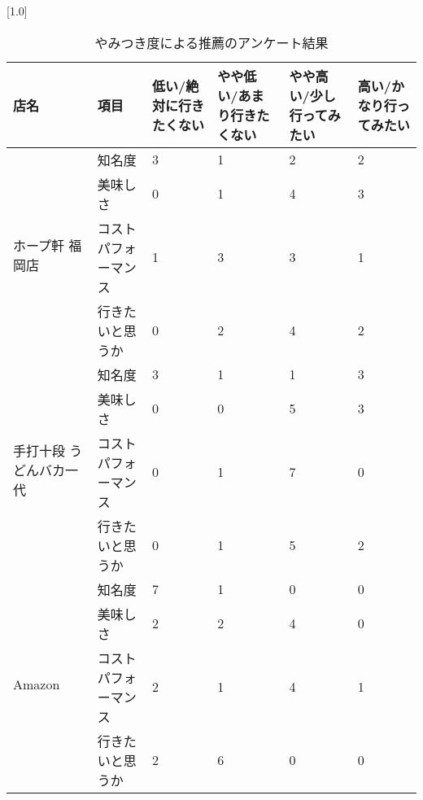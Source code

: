 \begin{table}[H]
\centering
\caption{やみつき度による推薦のアンケート結果}
\label{table:questionnaire:addictivity}
\small
\scalebox{0.7}[1.0]{
\begin{tabular}{|l|l|l|l|l|l|}
\hline
店名 & 項目 & 低い/絶対に行きたくない & やや低い/あまり行きたくない & やや高い/少し行ってみたい & 高い/かなり行ってみたい \\ \hline
\multirow{4}{*}{ホープ軒 福岡店} & 知名度 & 3 & 1 & 2 & 2 \\ \cline{2-6}
 & 美味しさ & 0 & 1 & 4 & 3 \\ \cline{2-6}
 & コストパフォーマンス & 1 & 3 & 3 & 1 \\ \cline{2-6}
 & 行きたいと思うか & 0 & 2 & 4 & 2 \\ \hline
\multirow{4}{*}{手打十段 うどんバカ一代} & 知名度 & 3 & 1 & 1 & 3 \\ \cline{2-6}
 & 美味しさ & 0 & 0 & 5 & 3 \\ \cline{2-6}
 & コストパフォーマンス & 0 & 1 & 7 & 0 \\ \cline{2-6}
 & 行きたいと思うか & 0 & 1 & 5 & 2 \\ \hline
\multirow{4}{*}{Amazon} & 知名度 & 7 & 1 & 0 & 0 \\ \cline{2-6}
 & 美味しさ & 2 & 2 & 4 & 0 \\ \cline{2-6}
 & コストパフォーマンス & 2 & 1 & 4 & 1 \\ \cline{2-6}
 & 行きたいと思うか & 2 & 6 & 0 & 0 \\ \hline
\end{tabular}
}
\end{table}
